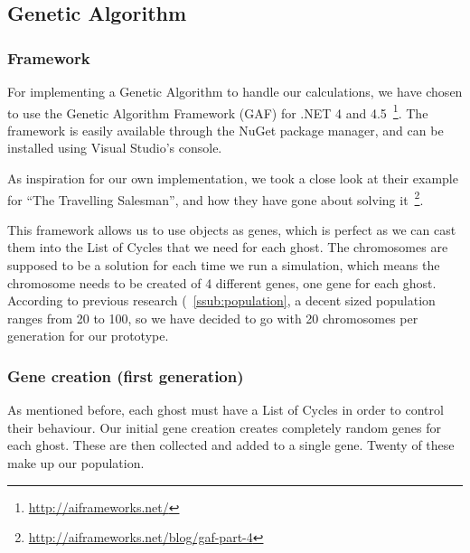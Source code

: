 \subsection{Genetic Algorithm}
\subsubsection*{Framework}
For implementing a Genetic Algorithm to handle our calculations, we have chosen to use the Genetic Algorithm Framework (GAF) for .NET 4 and 4.5~\footnote{\url{http://aiframeworks.net/}}.
The framework is easily available through the NuGet package manager, and can be installed using Visual Studio’s console.

As inspiration for our own implementation, we took a close look at their example for “The Travelling Salesman”, and how they have gone about solving it~\footnote{\url{http://aiframeworks.net/blog/gaf-part-4}}.

This framework allows us to use objects as genes, which is perfect as we can cast them into the List of Cycles that we need for each ghost. The chromosomes are supposed to be a solution for each time we run a simulation, which means the chromosome needs to be created of 4 different genes, one gene for each ghost. According to previous research (~\ref{ssub:population}, a decent sized population ranges from 20 to 100, so we have decided to go with 20 chromosomes per generation for our prototype.

\subsubsection*{Gene creation (first generation)}
As mentioned before, each ghost must have a List of Cycles in order to control their behaviour. Our initial gene creation creates completely random genes for each ghost. These are then collected and added to a single gene. Twenty of these make up our population.

